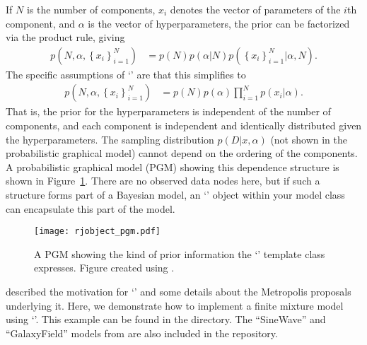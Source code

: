 \documentclass[article]{jss}
\begin{document}
If $N$ is the number of components, $x_i$ denotes the vector of parameters
of the $i$th component, and $\alpha$ is the vector of hyperparameters, the prior
can be factorized via the product rule, giving
\begin{align*}
p\left(N, \alpha, \left\{x_i\right\}_{i=1}^N\right)
&= p(N)p(\alpha | N)p\left(\left\{x_i\right\}_{i=1}^N | \alpha, N\right).
\end{align*}
The specific assumptions of `' are that this simplifies to
\begin{align}
p\left(N, \alpha, \left\{x_i\right\}_{i=1}^N\right)
&= p(N)p(\alpha)
\prod_{i=1}^N
p\left(x_i | \alpha\right).\label{eqn:rjobject}
\end{align}
That is, the prior for the hyperparameters is independent of the number of
components, and each component is independent and identically
distributed given the hyperparameters. The sampling distribution
$p(D | x, \alpha)$ (not shown in the probabilistic graphical model)
cannot depend on the ordering of the components.
A probabilistic graphical model (PGM) showing this dependence
structure is shown in Figure~\ref{fig:rjobject_pgm}. There are no observed
data nodes here, but if such a structure forms part of a
Bayesian model, an `' object within your model class
can encapsulate this part of the model.

\begin{figure}[t!]
\centering
\texttt{[image: rjobject\_pgm.pdf]}
\caption{A PGM showing the kind of prior information the `'
template class expresses.
Figure created using  \citep{daft}.\label{fig:rjobject_pgm}}
\end{figure}

\citet{brewer2014inference}
described the motivation for `' and some details
about the Metropolis proposals underlying it. Here, we demonstrate how to
implement a finite mixture model using `'.
This example can be found in the
directory. The ``SineWave'' and ``GalaxyField'' models
from \citet{brewer2014inference}
are also included in the  repository.
\end{document}
